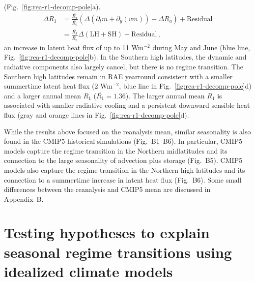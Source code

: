 \documentclass{ametsocV5}
\begin{document}
     (Fig.~\ref{fig:rea-r1-decomp-pole}a).
    \begin{align}
      \Delta R_1 &= \frac{\overline{R_1}}{\overline{R_a}}\left( \Delta(\partial_t m + \partial_y (vm))  - \Delta R_a \right) + \mathrm{Residual} \\
      &= \frac{\overline{R_1}}{\overline{R_a}}\Delta(\mathrm{LH+SH}) + \mathrm{Residual} \, ,
    \end{align}
     an increase in latent heat flux of up to 11 Wm$^{-2}$ during May and June (blue line, Fig.~\ref{fig:rea-r1-decomp-pole}b). In the Southern high latitudes, the dynamic and radiative components also largely cancel, but there is no regime transition. The Southern high latitudes remain in RAE yearround consistent with a smaller summertime latent heat flux (2 Wm$^{-2}$, blue line in Fig.~\ref{fig:rea-r1-decomp-pole}d) and a larger annual mean $R_1$ ($\overline{R_1}=1.36$). The larger annual mean $R_1$ is associated with smaller radiative cooling and a persistent downward sensible heat flux (gray and orange lines in Fig.~\ref{fig:rea-r1-decomp-pole}d).
    
    While the results above focused on the reanalysis mean, similar seasonality is also found in the CMIP5 historical simulations (Fig.~B1--B6). In particular, CMIP5 models capture the regime transition in the Northern midlatitudes and its connection to the large seasonality of advection plus storage (Fig.~B5). CMIP5 models also capture the regime transition in the Northern high latitudes and its connection to a summertime increase in latent heat flux (Fig.~B6). Some small differences between the reanalysis and CMIP5 mean are discussed in Appendix~B.

\section{Testing hypotheses to explain seasonal regime transitions using idealized climate models} \label{sec:hypo}
\end{document}

